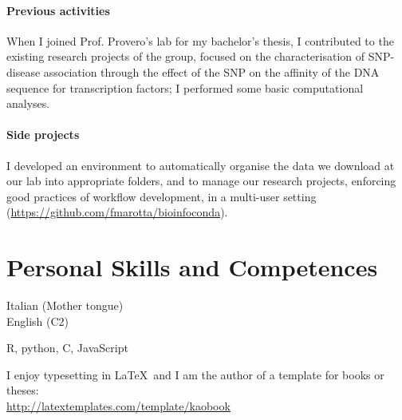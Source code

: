 \documentclass[10pt]{article} %
\begin{document}
\paragraph{Previous activities} When I joined Prof. Provero's lab for my bachelor's thesis, I contributed to the existing research projects of the group, focused on the characterisation of SNP-disease association through the effect of the SNP on the affinity of the DNA sequence for transcription factors; I performed some basic computational analyses.

\paragraph{Side projects} I developed an environment to automatically organise the data we download at our lab into appropriate folders, and to manage our research projects, enforcing good practices of workflow development, in a multi-user setting (\href{https://github.com/fmarotta/bioinfoconda}{https://github.com/fmarotta/bioinfoconda}).


\section{Personal Skills and Competences}

{
Italian (Mother tongue) \\
English (C2)
}

{
R, python, C, JavaScript
}

\skillgroup{\LaTeX}
{
I enjoy typesetting in \LaTeX\ and I am the author of a template for books or theses:\\
\href{http://latextemplates.com/template/kaobook/}{http://latextemplates.com/template/kaobook}
}








\nocite{*}
\printbibliography[title=Publications]
\end{document}
